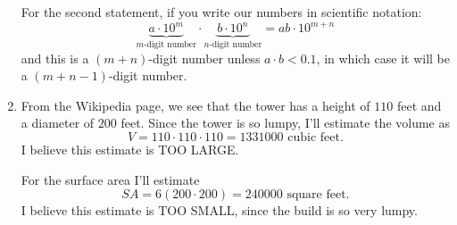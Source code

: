 \documentclass[nooutcomes,noauthor]{ximera}
\begin{document}
\begin{question}
\begin{freeResponse}
\begin{enumerate}
      For the second statement, if you write our numbers in scientific
      notation:
      \[
      \underbrace{a\cdot 10^m}_{\text{$m$-digit number}} \cdot \underbrace{b\cdot 10^n}_{\text{$n$-digit number}} = ab\cdot 10^{m+n}
      \]
      and this is a $(m+n)$-digit number unless $a\cdot b<0.1$, in which
      case it will be a $(m+n-1)$-digit number.
    \item From the Wikipedia page, we see that the tower has a height
      of $110$ feet and a diameter of $200$ feet. Since the tower is so lumpy, I'll estimate the volume as
      \[
      V = 110\cdot 110\cdot 110 = 1331000 \text{ cubic feet}.
      \]
      I believe this estimate is TOO LARGE.

      For the surface area I'll estimate
      \[
      SA = 6(200\cdot 200) = 240000\text{ square feet}.
      \]
      I believe this estimate is TOO SMALL, since the build is so very
      lumpy.
    \end{enumerate}
  \end{freeResponse}
\end{question}
\end{document}
